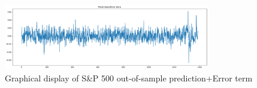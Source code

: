 \documentclass[a4paper,11pt,oneside]{book}
\begin{document}
\begin{figure}[!h]
	\centering
	\includegraphics[width=0.8\textwidth]{figures/sanperror}
	\caption{Graphical display of S\&P 500 out-of-sample prediction+Error term}
	\label{sanpERROR}
\end{figure}












\end{document}
